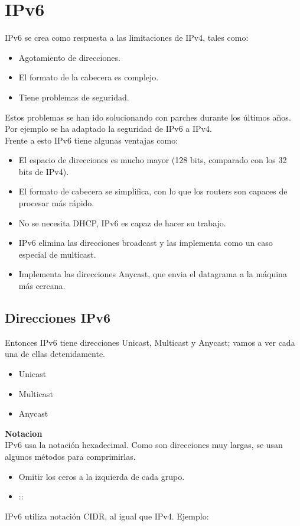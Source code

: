 \section{IPv6}
IPv6 se crea como respuesta a las limitaciones de IPv4, tales como:
\begin{itemize}
    \item Agotamiento de direcciones.
    \item El formato de la cabecera es complejo.
    \item Tiene problemas de seguridad.
\end{itemize}
Estos problemas se han ido solucionando con parches durante los últimos años. Por ejemplo se ha adaptado la seguridad de IPv6 a IPv4.
\\
Frente a esto IPv6 tiene algunas ventajas como:
\begin{itemize}
    \item El espacio de direcciones es mucho mayor (128 bits, comparado con los 32 bits de IPv4).
    \item El formato de cabecera se simplifica, con lo que los routers son capaces de procesar más rápido.
    \item No se necesita DHCP, IPv6 es capaz de hacer su trabajo.
    \item IPv6 elimina las direcciones broadcast y las implementa como un caso especial de multicast.
    \item Implementa las direcciones Anycast, que envia el datagrama a la máquina más cercana.
\end{itemize}
\subsection{Direcciones IPv6}

Entonces IPv6 tiene direcciones Unicast, Multicast y Anycast; vamos a ver cada una de ellas detenidamente.
\begin{itemize}
    \item Unicast
    \item Multicast
    \item Anycast
\end{itemize}
\textbf{Notacion}\\
IPv6 usa la notación hexadecimal. Como son direcciones muy largas, se usan algunos métodos para comprimirlas.
\begin{itemize}
    \item Omitir los ceros a la izquierda de cada grupo.
    \item ::

\end{itemize}
IPv6 utiliza notación CIDR, al igual que IPv4. Ejemplo:\\
